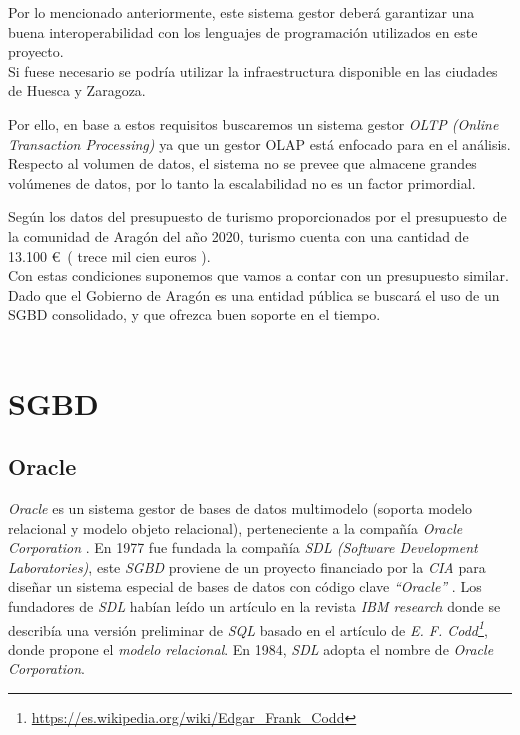 \documentclass[3pt]{article}
\begin{document}
Por lo mencionado anteriormente, este sistema gestor deberá garantizar una buena interoperabilidad con los lenguajes de programación utilizados en este proyecto. \\

Si fuese necesario se podría utilizar la infraestructura disponible en las ciudades de Huesca y Zaragoza.

Por ello, en base a estos requisitos buscaremos un sistema gestor \textit{OLTP (Online Transaction Processing)} ya que un gestor OLAP está enfocado para en el análisis. Respecto al volumen de datos, el sistema no se prevee que almacene grandes volúmenes de datos, por lo tanto la escalabilidad no es un factor primordial.

Según los datos del presupuesto de turismo proporcionados por el presupuesto de la comunidad de Aragón del año 2020, turismo cuenta con una cantidad de 13.100 \euro \ ( trece mil cien euros ).\cite{ARAG:1}\\
Con estas condiciones suponemos que vamos a contar con un presupuesto similar.\\

Dado que el Gobierno de Aragón es una entidad pública se buscará el uso de un SGBD consolidado, y que ofrezca buen soporte en el tiempo. \\\\

\section{SGBD}

\subsection{Oracle}

\emph{Oracle} es un sistema gestor de bases de datos multimodelo (soporta modelo relacional y modelo objeto relacional), perteneciente a la compañía \emph{Oracle Corporation} \cite{WIKI:1} . En 1977 fue fundada la compañía \emph{SDL (Software Development Laboratories)}, este \emph{SGBD} proviene de un proyecto financiado por la \emph{CIA} para diseñar un sistema especial de bases de datos con código clave \emph{``Oracle''} \cite{WIKI:2}. Los fundadores de \emph{SDL} habían leído un artículo en la revista \emph{IBM research} donde se describía una versión preliminar de \emph{SQL} basado en el artículo de \emph{E. F. Codd\footnote{\url{https://es.wikipedia.org/wiki/Edgar_Frank_Codd}}}, donde propone el \emph{modelo relacional}. En 1984, \emph{SDL} adopta el nombre de \emph{Oracle Corporation}.\\
\end{document}

